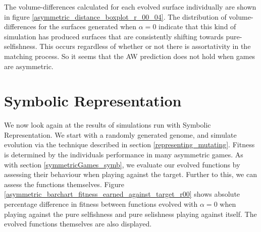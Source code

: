 \documentclass[11pt]{book}
\newcommand*{\np}{\par\noindent\newline}
\begin{document}
\np The volume-differences calculated for each evolved surface individually are shown in figure \ref{asymmetric_distance_boxplot_r_00_04}.
The distribution of volume-differences for the surfaces generated when $\alpha = 0$ indicate that this kind of simulation has produced surfaces that are consistently shifting towards pure-selfishness.
This occurs regardless of whether or not there is assortativity in the matching process. 
So it seems that the AW prediction does not hold when games are asymmetric.




\section{Symbolic Representation}\label{asymmetricGames_symb}
We now look again at the results of simulations run with Symbolic Representation.
We start with a randomly generated genome, and simulate evolution via the technique described in section \ref{representing_mutating}.
Fitness is determined by the individuals performance in many asymmetric games.
As with section \ref{symmetricGames_symb}, we evaluate our evolved functions by assessing their behaviour when playing against the target.
Further to this, we can assess the functions themselves.
Figure \ref{asymmetric_barchart_fitness_earned_against_target_r00} shows absolute percentage difference in fitness between functions evolved with $\alpha = 0$ when playing against the pure selfishness and pure selishness playing against itself.
The evolved functions themselves are also displayed.
\end{document}
